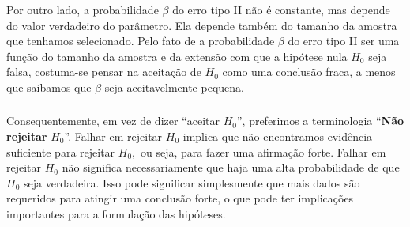 \documentclass[14pt,aspectratio=1610]{beamer}
\newcommand{\Ho}{\ensuremath{H_{0}}}
\begin{document}
\begin{frame}{}
\frametitle{}
\begin{block}{}
\justifying
Por outro lado, a probabilidade $\beta$ do erro tipo II não é constante, mas depende do valor verdadeiro do parâmetro. Ela depende também do tamanho da amostra 
que tenhamos selecionado. Pelo fato de a probabilidade $\beta$ do erro tipo II ser uma função do tamanho da amostra e da extensão com que a hipótese nula $\Ho$ 
seja falsa, costuma-se pensar na aceitação de $\Ho$ como uma conclusão fraca, a menos que saibamos que $\beta$ seja aceitavelmente pequena. 
\end{block}
\end{frame}

\begin{frame}{}
\frametitle{}
\begin{block}{}
\justifying
Consequentemente, em vez de dizer ``aceitar $\Ho$'', preferimos a terminologia ``\textbf{Não rejeitar }$\Ho$''. Falhar em rejeitar $\Ho$ implica que não encontramos evidência 
suficiente para rejeitar $\Ho,$ ou seja, para fazer uma afirmação forte. Falhar em rejeitar $\Ho$ não significa necessariamente que haja uma alta probabilidade de que 
$\Ho$ seja verdadeira. Isso pode significar simplesmente que mais dados são requeridos para atingir uma conclusão forte, o que pode ter implicações importantes para 
a formulação das hipóteses.
\end{block}
\end{frame}

\end{document}

